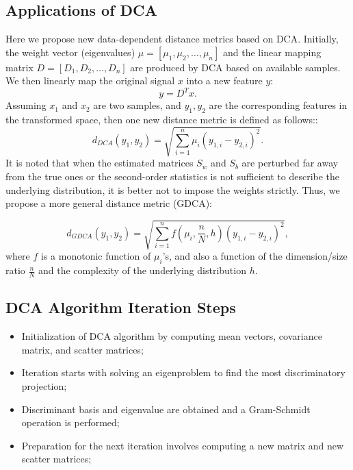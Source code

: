 \documentclass[12pt]{article}
\begin{document}
\subsection{Applications of DCA}
\hspace{10pt}
Here we propose new data-dependent distance metrics based on DCA. Initially, the weight vector (eigenvalues) 
$\mu = [\mu_1, \mu_2, \ldots, \mu_n]$ and the linear mapping matrix $D = [D_1, D_2, \ldots, D_n]$ are 
produced by DCA based on available samples. We then linearly map the original signal $x$ into a new feature $y$:
\[ y = D^T x. \]
Assuming $x_1$ and $x_2$ are two samples, and $y_1, y_2$ are the corresponding features in the transformed
space, then one new distance metric is defined as follows::
\begin{equation}
\label{eq:3}
d_{DCA}(y_1, y_2) = \sqrt{\sum_{i=1}^{n} \mu_i (y_{1,i} - y_{2,i})^2}.
\end{equation}
It is noted that when the estimated matrices $S_w$ and $S_b$ are perturbed far away from the true ones or the second-order statistics is not sufficient to describe the underlying distribution, it is better not to impose the weights strictly. Thus, we propose a more general distance metric (GDCA):

\begin{equation}
\label{eq:4}
d_{GDCA}(y_1, y_2) = \sqrt{\sum_{i=1}^{n} f(\mu_i, \frac{n}{N}, h) (y_{1,i} - y_{2,i})^2},
\end{equation}
where $f$ is a monotonic function of $\mu_i$’s, and also a function of the dimension/size ratio $\frac{n}{N}$ and the
complexity of the underlying distribution $h$.

\subsection{DCA Algorithm Iteration Steps}
\hspace{10pt}
\begin{itemize}
    \item Initialization of DCA algorithm by computing mean vectors, covariance matrix, and scatter matrices;
    \item Iteration starts with solving an eigenproblem to find the most discriminatory projection;
    \item Discriminant basis and eigenvalue are obtained and a Gram-Schmidt operation is performed;
    \item Preparation for the next iteration involves computing a new matrix and new scatter matrices;
\end{itemize}
\end{document}
